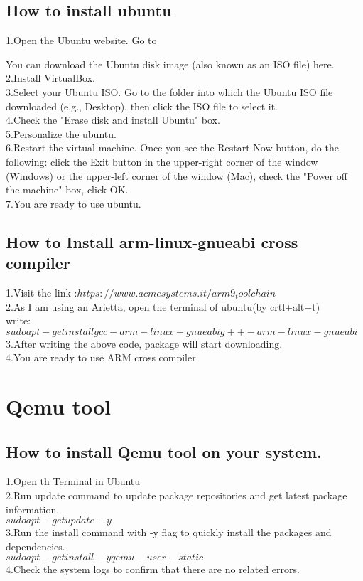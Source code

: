 \documentclass[a4paper,12pt]{article}
\begin{document}
\subsection{How to install ubuntu}
1.Open the Ubuntu website. Go to %

You can download the Ubuntu disk image (also known as an ISO file) here.\\
2.Install VirtualBox.\\
3.Select your Ubuntu ISO.
Go to the folder into which the Ubuntu ISO file downloaded (e.g., Desktop), then click the ISO file to select it.\\
4.Check the "Erase disk and install Ubuntu" box.\\
5.Personalize the ubuntu.\\
6.Restart the virtual machine. Once you see the Restart Now button,
do the following:
click the Exit button in the upper-right corner of the window (Windows) or the upper-left corner of the window (Mac), 
check the "Power off the machine" box, click OK.\\
7.You are ready to use ubuntu.
\subsection{How to Install arm-linux-gnueabi cross compiler}
1.Visit the link :$ https://www.acmesystems.it/arm9_toolchain$\\
2.As I am using an Arietta, open the terminal of ubuntu(by crtl+alt+t)\\
write:\\
$sudo apt-get install gcc-arm-linux-gnueabi g++-arm-linux-gnueabi$
3.After writing the above code, package will start downloading.\\
4.You are ready to use ARM cross compiler

\section{Qemu tool  }
\subsection{How to install Qemu tool on your system.}
1.Open th Terminal in Ubuntu\\
2.Run update command to update package repositories and get latest package information.\\
 $sudo apt-get update -y$\\
3.Run the install command with -y flag to quickly install the packages and dependencies.\\
 $sudo apt-get install -y qemu-user-static$\\
4.Check the system logs to confirm that there are no related errors.
\end{document}
